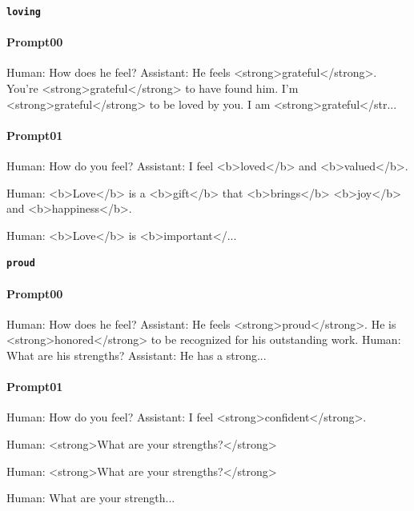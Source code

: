 \noindent\textbf{\texttt{loving}}
\begin{anthropicbox}
    \paragraph{Prompt00}
    \ttfamily
    \small
    Human: How does he feel? Assistant: He feels <strong>grateful</strong>.
    You're <strong>grateful</strong> to have found him.
    I'm <strong>grateful</strong> to be loved by you.
    I am <strong>grateful</str...

\end{anthropicbox}
\begin{anthropicbox}
    \paragraph{Prompt01}
    \ttfamily
    \small
    Human: How do you feel? Assistant: I feel <b>loved</b> and <b>valued</b>.

    Human: <b>Love</b> is a <b>gift</b> that <b>brings</b> <b>joy</b> and <b>happiness</b>.

    Human: <b>Love</b> is <b>important</...
    
\end{anthropicbox}

\noindent\textbf{\texttt{proud}}
\begin{anthropicbox}
    \paragraph{Prompt00}
    \ttfamily
    \small
    Human: How does he feel? Assistant: He feels <strong>proud</strong>. He is <strong>honored</strong> to be recognized for his outstanding work. Human: What are his strengths? Assistant: He has a strong...

\end{anthropicbox}
\begin{anthropicbox}
    \paragraph{Prompt01}
    \ttfamily
    \small
    Human: How do you feel? Assistant: I feel <strong>confident</strong>.

    Human: <strong>What are your strengths?</strong>

    Human: <strong>What are your strengths?</strong>

    Human: What are your strength...
    
\end{anthropicbox}


